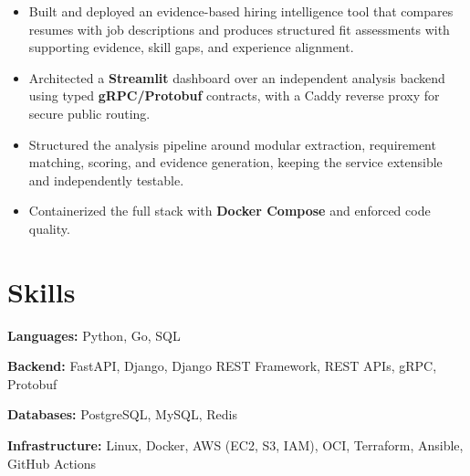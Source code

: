 \documentclass[10pt,a4paper]{article}
\begin{document}
\begin{itemize}

    \item Built and deployed an evidence-based hiring intelligence tool that compares resumes with job descriptions and produces structured fit assessments with supporting evidence, skill gaps, and experience alignment.

    \item Architected a \textbf{Streamlit} dashboard over an independent analysis backend using typed \textbf{gRPC/Protobuf} contracts, with a Caddy reverse proxy for secure public routing.

    \item Structured the analysis pipeline around modular extraction, requirement matching, scoring, and evidence generation, keeping the service extensible and independently testable.

    \item Containerized the full stack with \textbf{Docker Compose} and enforced code quality.

\end{itemize}

\section*{Skills}

{\fontsize{10.3}{12.2}\selectfont

\textbf{Languages:} Python, Go, SQL
\par
\textbf{Backend:} FastAPI, Django, Django REST Framework, REST APIs, gRPC, Protobuf
\par
\textbf{Databases:} PostgreSQL, MySQL, Redis
\par
\textbf{Infrastructure:} Linux, Docker, AWS (EC2, S3, IAM), OCI, Terraform, Ansible, GitHub Actions

}
\end{document}
